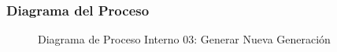 \subsubsection{Diagrama del Proceso}
\begin{figure}[H]
    \centering
        \caption{Diagrama de Proceso Interno 03: Generar Nueva Generación}%
    \label{fig:process_diagram03}
\end{figure}
\newpage